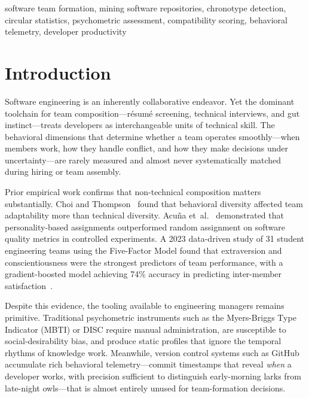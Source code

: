 \documentclass[conference]{IEEEtran}
\begin{document}
\begin{IEEEkeywords}
software team formation, mining software repositories, chronotype
detection, circular statistics, psychometric assessment, compatibility
scoring, behavioral telemetry, developer productivity
\end{IEEEkeywords}

\section{Introduction}
\label{sec:intro}

Software engineering is an inherently collaborative endeavor.
Yet the dominant toolchain for team composition—résumé screening,
technical interviews, and gut instinct—treats developers as
interchangeable units of technical skill.
The behavioral dimensions that determine whether a team operates
smoothly—when members work, how they handle conflict, and how they
make decisions under uncertainty—are rarely measured and almost never
systematically matched during hiring or team assembly.

Prior empirical work confirms that non-technical composition matters
substantially.
Choi and Thompson~\cite{choi2005group} found that behavioral diversity
affected team adaptability more than technical diversity.
Acu\~{n}a et~al.~\cite{acuna2009personality} demonstrated that
personality-based assignments outperformed random assignment on software
quality metrics in controlled experiments.
A 2023 data-driven study of 31 student engineering teams using the
Five-Factor Model found that extraversion and conscientiousness were the
strongest predictors of team performance, with a gradient-boosted model
achieving 74\% accuracy in predicting inter-member
satisfaction~\cite{silva2023data}.

Despite this evidence, the tooling available to engineering managers
remains primitive.
Traditional psychometric instruments such as the Myers-Briggs Type
Indicator (MBTI) or DISC require manual administration, are susceptible
to social-desirability bias, and produce static profiles that ignore the
temporal rhythms of knowledge work.
Meanwhile, version control systems such as GitHub accumulate rich
behavioral telemetry—commit timestamps that reveal \emph{when} a
developer works, with precision sufficient to distinguish early-morning
larks from late-night owls—that is almost entirely unused for
team-formation decisions.
\end{document}
